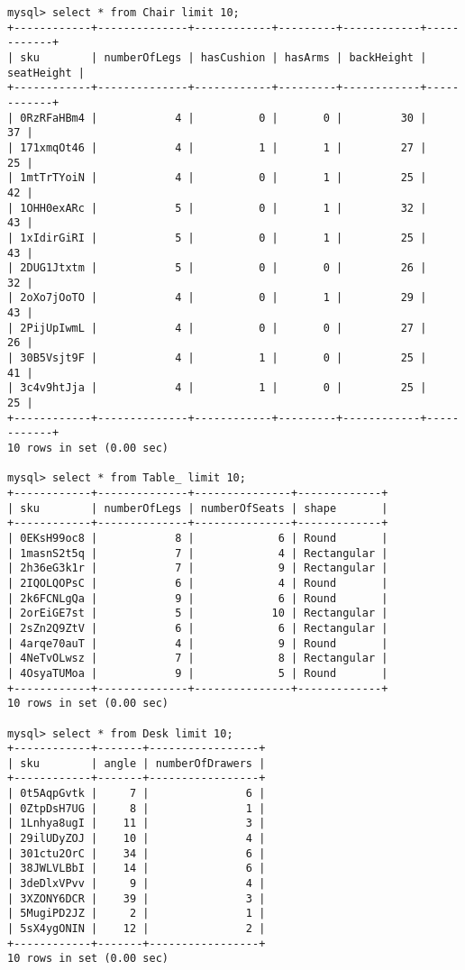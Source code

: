 \documentclass[american,extrafontsizes,12pt,portrait,letterpaper,oneside,onecolumn,article,final]{memoir}
\begin{document}
\begin{verbatim}
mysql> select * from Chair limit 10;
+------------+--------------+------------+---------+------------+------------+
| sku        | numberOfLegs | hasCushion | hasArms | backHeight | seatHeight |
+------------+--------------+------------+---------+------------+------------+
| 0RzRFaHBm4 |            4 |          0 |       0 |         30 |         37 |
| 171xmqOt46 |            4 |          1 |       1 |         27 |         25 |
| 1mtTrTYoiN |            4 |          0 |       1 |         25 |         42 |
| 1OHH0exARc |            5 |          0 |       1 |         32 |         43 |
| 1xIdirGiRI |            5 |          0 |       1 |         25 |         43 |
| 2DUG1Jtxtm |            5 |          0 |       0 |         26 |         32 |
| 2oXo7jOoTO |            4 |          0 |       1 |         29 |         43 |
| 2PijUpIwmL |            4 |          0 |       0 |         27 |         26 |
| 30B5Vsjt9F |            4 |          1 |       0 |         25 |         41 |
| 3c4v9htJja |            4 |          1 |       0 |         25 |         25 |
+------------+--------------+------------+---------+------------+------------+
10 rows in set (0.00 sec)

mysql> select * from Table_ limit 10;
+------------+--------------+---------------+-------------+
| sku        | numberOfLegs | numberOfSeats | shape       |
+------------+--------------+---------------+-------------+
| 0EKsH99oc8 |            8 |             6 | Round       |
| 1masnS2t5q |            7 |             4 | Rectangular |
| 2h36eG3k1r |            7 |             9 | Rectangular |
| 2IQOLQOPsC |            6 |             4 | Round       |
| 2k6FCNLgQa |            9 |             6 | Round       |
| 2orEiGE7st |            5 |            10 | Rectangular |
| 2sZn2Q9ZtV |            6 |             6 | Rectangular |
| 4arqe70auT |            4 |             9 | Round       |
| 4NeTvOLwsz |            7 |             8 | Rectangular |
| 4OsyaTUMoa |            9 |             5 | Round       |
+------------+--------------+---------------+-------------+
10 rows in set (0.00 sec)

mysql> select * from Desk limit 10;
+------------+-------+-----------------+
| sku        | angle | numberOfDrawers |
+------------+-------+-----------------+
| 0t5AqpGvtk |     7 |               6 |
| 0ZtpDsH7UG |     8 |               1 |
| 1Lnhya8ugI |    11 |               3 |
| 29ilUDyZOJ |    10 |               4 |
| 301ctu2OrC |    34 |               6 |
| 38JWLVLBbI |    14 |               6 |
| 3deDlxVPvv |     9 |               4 |
| 3XZONY6DCR |    39 |               3 |
| 5MugiPD2JZ |     2 |               1 |
| 5sX4ygONIN |    12 |               2 |
+------------+-------+-----------------+
10 rows in set (0.00 sec)


\end{verbatim}
\end{document}
